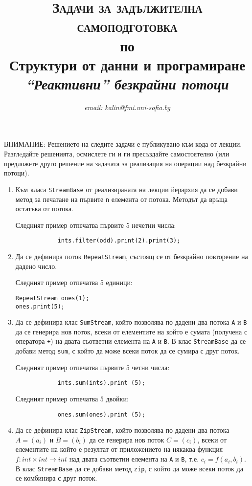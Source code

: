 \documentclass[12pt,a4paper]{article}
\author{\textit{email: kalin@fmi.uni-sofia.bg}}
\title{\textsc{Задачи за задължителна самоподготовка} \\
по \\
Структури от данни и програмиране\\
\textit{``Реактивни'' безкрайни потоци}}
\begin{document}
\maketitle


ВНИМАНИЕ: Решението на следите задачи е публикувано към кода от лекции. Разглeдайте решенията, осмислете ги и ги пресъздайте самостоятелно (или предложете друго решение на задачата за реализация на операции над безкрайни потоци).

\begin{enumerate}

	\item  Към класа \texttt{StreamBase} от реализираната на лекции йерархия да се добави метод за печатане на първите \texttt{n} елемента от потока. Методът да връща остатъка от потока.


	Следният пример отпечатва първите 5 нечетни числа:
	\begin{verbatim}
			ints.filter(odd).print(2).print(3);
	\end{verbatim}

	\item Да се дефинира поток \texttt{RepeatStream}, състоящ се от безкрайно повторение на дадено число.

	Следният пример отпечатва 5 единици:
	\begin{verbatim}
RepeatStream ones(1);
ones.print(5);
	\end{verbatim}


	\item Да се дефинира клас \texttt{SumStream}, който позволява по дадени два потока \texttt{A} и \texttt{B} да се генерира нов поток, всеки от елементите на който е сумата (получена с оператора \texttt{+}) на двата съответни елемента на \texttt{A} и \texttt{B}. В клас \texttt{StreamBase} да се добави метод \texttt{sum}, с който да може всеки поток да се сумира с друг поток.

	Следният пример отпечатва първите 5 четни числа:
	\begin{verbatim}
			ints.sum(ints).print (5);
	\end{verbatim}

	Следният пример отпечатва 5 двойки:
	\begin{verbatim}
			ones.sum(ones).print (5);
	\end{verbatim}


	\item Да се дефинира клас \texttt{ZipStream}, който позволява по дадени два потока $A=(a_i)$ и $B=(b_i)$ да се генерира нов поток $C=(c_i)$, всеки от елементите на който е резултат от приложението на някаква функция $f:int \times int \rightarrow int$ над двата съответни елемента на \texttt{A} и \texttt{B}, т.е. $c_i=f(a_i,b_i)$. В клас \texttt{StreamBase} да се добави метод \texttt{zip}, с който да може всеки поток да се комбинира с друг поток.


\end{enumerate}
\end{document}
